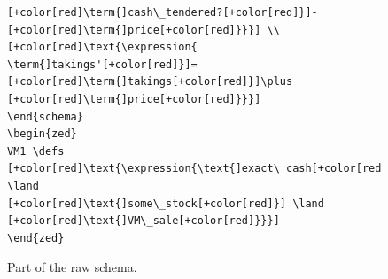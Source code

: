 \begin{figure}[H]
\begin{minipage}{0.45\textwidth}
\begin{tiny}
\begin{BVerbatim}[commandchars=+\[\]]
[+color[red]\term{]cash\_tendered?[+color[red]}]-[+color[red]\term{]price[+color[red]}}}] \\
[+color[red]\text{\expression{
\term{]takings'[+color[red]}]=[+color[red]\term{]takings[+color[red]}]\plus [+color[red]\term{]price[+color[red]}}}]
\end{schema}
\begin{zed}
VM1 \defs [+color[red]\text{\expression{\text{]exact\_cash[+color[red]}] \land 
[+color[red]\text{]some\_stock[+color[red]}] \land [+color[red]\text{]VM\_sale[+color[red]}}}]
\end{zed}
\end{BVerbatim}
\end{tiny}
\vspace{-0.2in}
\caption{Part of the raw schema.\label{fig:zcgaschema}}
\vspace{-0.2in}
\end{minipage}\hfill
\begin{minipage}{0.45\textwidth}
\centering
\centering

\end{minipage}
\end{figure}
